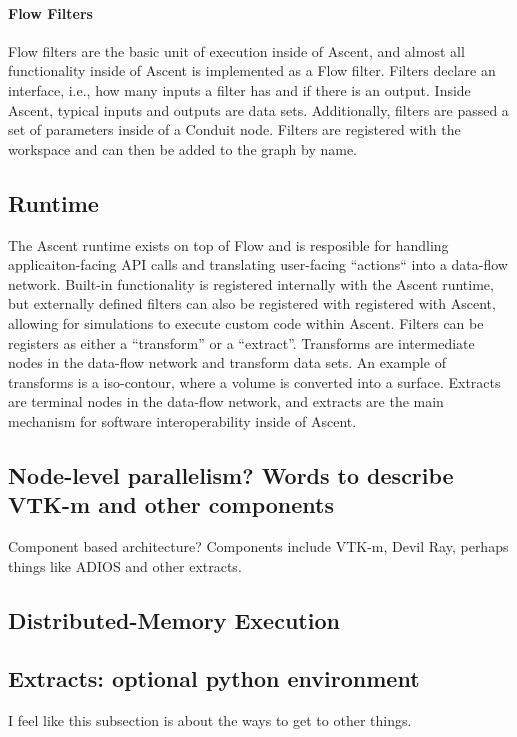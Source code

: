\paragraph{Flow Filters}
Flow filters are the basic unit of execution inside of Ascent, and
almost all functionality inside of Ascent is implemented as a Flow filter.
%
Filters declare an interface, i.e., how many inputs a filter has and
if there is an output.
%
Inside Ascent, typical inputs and outputs are data sets.
%
Additionally, filters are passed a set of parameters inside of a Conduit
node.
%
Filters are registered with the workspace and can then be added to the
graph by name.


\subsection{Runtime}
The Ascent runtime exists on top of Flow and is resposible for
handling applicaiton-facing API calls and translating user-facing
``actions`` into a data-flow network.
%
Built-in functionality is registered internally with the Ascent runtime,
but externally defined filters can also be registered with registered
with Ascent, allowing for simulations to execute custom code within Ascent.
%
Filters can be registers as either a ``transform'' or a ``extract''.
%
Transforms are intermediate nodes in the data-flow network and transform
data sets.
%
An example of transforms is a iso-contour, where a volume is converted
into a surface.
%
Extracts are terminal nodes in the data-flow network, and extracts
are the main mechanism for software interoperability inside of Ascent.

\subsection{Node-level parallelism? Words to describe VTK-m and other components}

Component based architecture? Components include VTK-m, Devil Ray, perhaps things like ADIOS and other extracts.

\subsection{Distributed-Memory Execution}

\subsection{Extracts: optional python environment}
I feel like this subsection is about the ways to get to other things.
